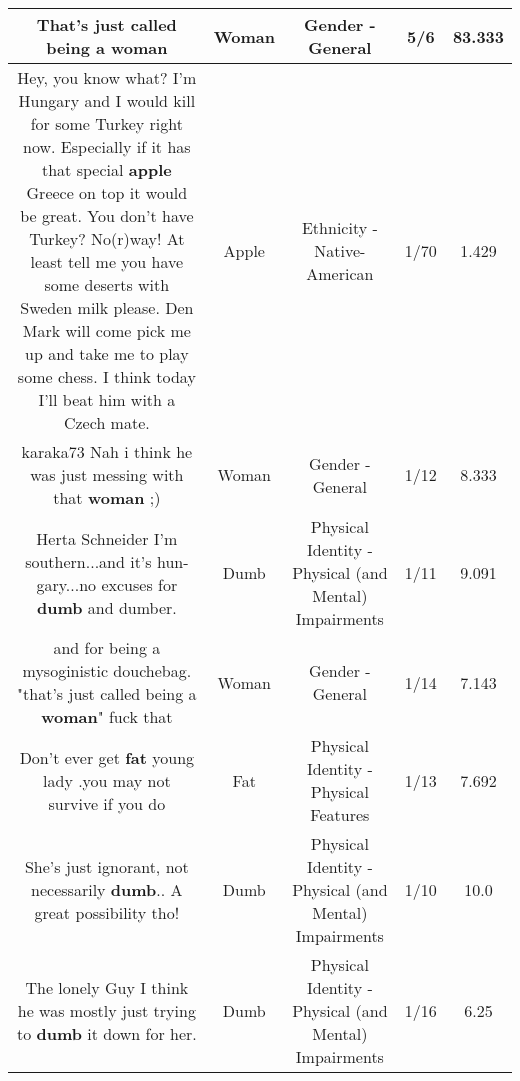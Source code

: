 \documentclass[11pt]{article}
\newlength\mylength
\begin{document}
\begin{center}
\begin{longtable}{|C{.65\mylength}|C{.30\mylength}|C{.12\mylength}|C{.12\mylength}|C{.12\mylength}|}
  \small That's just called being a woman\normalsize   & Woman & Gender - General & 5/6 & 83.333 \\  \hline
  \small Hey, you know what? I'm Hungary and I would kill for some Turkey right now. Especially if it has that special \textbf{apple} Greece on top it would be great. You don't have Turkey? No(r)way! At least tell me you have some deserts with Sweden milk please. Den Mark will come pick me up and take me to play some chess. I think today I'll beat him with a Czech mate.\normalsize   & Apple & Ethnicity - Native-American & 1/70 & 1.429 \\  \hline
  \small karaka73 Nah i think he was just messing with that \textbf{woman} ;)\normalsize   & Woman & Gender - General & 1/12 & 8.333 \\  \hline
  \small Herta Schneider I'm southern...and it's hun-gary...no excuses for \textbf{dumb} and dumber.\normalsize   & Dumb & Physical Identity - Physical (and Mental) Impairments & 1/11 & 9.091 \\  \hline
  \small and for being a mysoginistic douchebag. "that's just called being a \textbf{woman}" fuck that\normalsize   & Woman & Gender - General & 1/14 & 7.143 \\  \hline
  \small Don't ever get \textbf{fat} young lady .you may not survive if you do\normalsize   & Fat & Physical Identity - Physical Features & 1/13 & 7.692 \\  \hline
  \small She's just ignorant, not necessarily \textbf{dumb}.. A great possibility tho!\normalsize   & Dumb & Physical Identity - Physical (and Mental) Impairments & 1/10 & 10.0 \\  \hline
  \small The lonely Guy I think he was mostly just trying to \textbf{dumb} it down for her.\normalsize   & Dumb & Physical Identity - Physical (and Mental) Impairments & 1/16 & 6.25 \\  \hline

\end{longtable}
\end{center}
\end{document}
